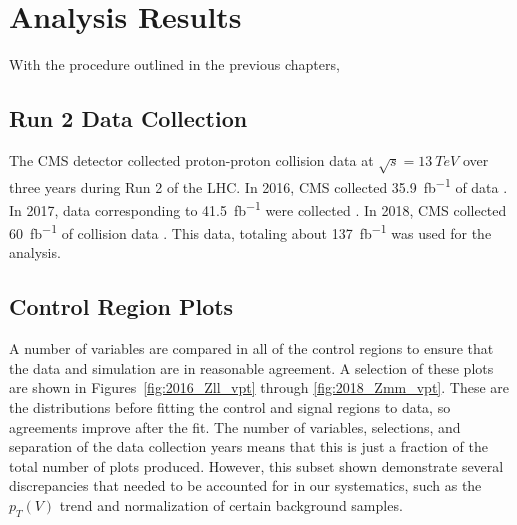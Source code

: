 \chapter{Analysis Results} \label{ch:results}

With the procedure outlined in the previous chapters, 

\section{Run 2 Data Collection}

The CMS detector collected proton-proton collision data at $\sqrt{s} = \SI{13}{TeV}$
over three years during Run 2 of the LHC.
In 2016, CMS collected \SI{35.9}{fb^{-1}} of data \cite{CMS-PAS-LUM-17-001}.
In 2017, data corresponding to \SI{41.5}{fb^{-1}} were collected \cite{CMS-PAS-LUM-17-004}.
In 2018, CMS collected \SI{60}{fb^{-1}} of collision data \cite{CMS-PAS-LUM-18-002}.
This data, totaling about \SI{137}{fb^{-1}} was used for the analysis.

\section{Control Region Plots}

A number of variables are compared in all of the control regions
to ensure that the data and simulation are in reasonable agreement.
A selection of these plots are shown in Figures~\ref{fig:2016_Zll_vpt} through \ref{fig:2018_Zmm_vpt}.
These are the distributions before fitting the control and signal regions to data,
so agreements improve after the fit.
The number of variables, selections, and separation of the data collection years
means that this is just a fraction of the total number of plots produced.
However, this subset shown demonstrate several discrepancies that needed to be accounted for in our systematics,
such as the $p_T(V)$ trend and normalization of certain background samples.

